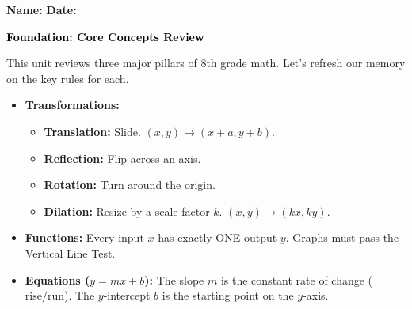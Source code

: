 \documentclass[12pt, letterpaper, fleqn]{article}
\begin{document}
\textbf{Name:} \underline{\hspace{5cm}}
\hfill
\textbf{Date:} \underline{\hspace{3cm}}\\

\begin{tcolorbox}[colback=customteal!20]
    \large\textcolor{black}{\textbf{Foundation: Core Concepts Review}}
\end{tcolorbox}

\vspace{3mm}

\noindent
This unit reviews three major pillars of 8th grade math. Let's refresh our memory on the key rules for each.

\begin{itemize}
    \item \textbf{Transformations:} 
    \begin{itemize}
        \item \textbf{Translation:} Slide. $(x, y) \rightarrow (x+a, y+b)$.
        \item \textbf{Reflection:} Flip across an axis.
        \item \textbf{Rotation:} Turn around the origin.
        \item \textbf{Dilation:} Resize by a scale factor $k$. $(x, y) \rightarrow (kx, ky)$.
    \end{itemize}
    \item \textbf{Functions:} Every input $x$ has exactly ONE output $y$. Graphs must pass the Vertical Line Test.
    \item \textbf{Equations ($y = mx + b$):} The slope $m$ is the constant rate of change ($\text{rise}/\text{run}$). The $y$-intercept $b$ is the starting point on the $y$-axis.
\end{itemize}

\vspace{4mm}
\end{document}
